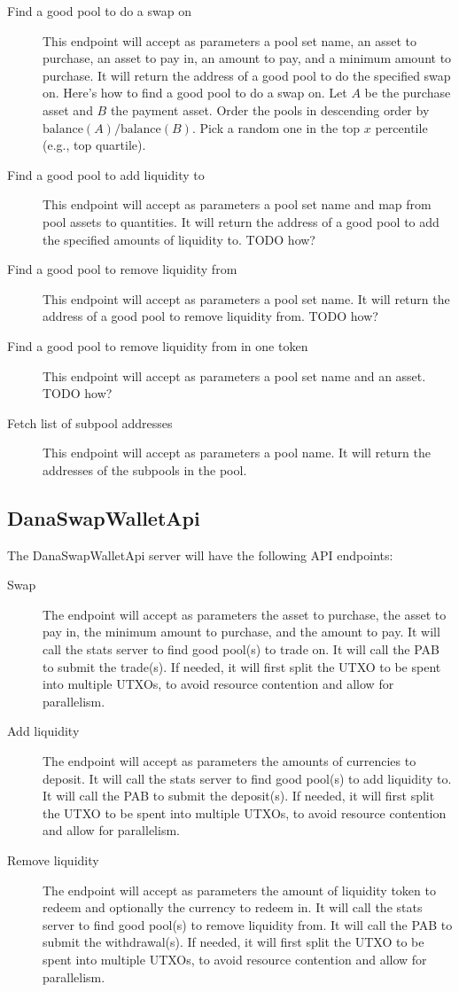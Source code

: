 \documentclass[12pt]{article}
\begin{document}
\begin{description}
	\item[Find a good pool to do a swap on] This endpoint will accept as parameters a pool set name, an asset to purchase, an asset to pay in, an amount to pay, and a minimum amount to purchase. It will return the address of a good pool to do the specified swap on. Here's how to find a good pool to do a swap on. Let $A$ be the purchase asset and $B$ the payment asset. Order the pools in descending order by $\text{balance}(A) / \text{balance}(B)$. Pick a random one in the top $x$ percentile (e.g., top quartile). 
	\item[Find a good pool to add liquidity to] This endpoint will accept as parameters a pool set name and map from pool assets to quantities. It will return the address of a good pool to add the specified amounts of liquidity to. TODO how?
	\item[Find a good pool to remove liquidity from] This endpoint will accept as parameters a pool set name. It will return the address of a good pool to remove liquidity from. TODO how?
	\item[Find a good pool to remove liquidity from in one token] This endpoint will accept as parameters a pool set name and an asset. TODO how?
	\item[Fetch list of subpool addresses] This endpoint will accept as parameters a pool name. It will return the addresses of the subpools in the pool.
\end{description}


\subsection{DanaSwapWalletApi}

The DanaSwapWalletApi server will have the following API endpoints:

\begin{description}
	\item[Swap] The endpoint will accept as parameters the asset to purchase, the asset to pay in, the minimum amount to purchase, and the amount to pay. It will call the stats server to find good pool(s) to trade on. It will call the PAB to submit the trade(s). If needed, it will first split the UTXO to be spent into multiple UTXOs, to avoid resource contention and allow for parallelism.
	\item[Add liquidity] The endpoint will accept as parameters the amounts of currencies to deposit. It will call the stats server to find good pool(s) to add liquidity to. It will call the PAB to submit the deposit(s). If needed, it will first split the UTXO to be spent into multiple UTXOs, to avoid resource contention and allow for parallelism.
	\item[Remove liquidity] The endpoint will accept as parameters the amount of liquidity token to redeem and optionally the currency to redeem in. It will call the stats server to find good pool(s) to remove liquidity from. It will call the PAB to submit the withdrawal(s). If needed, it will first split the UTXO to be spent into multiple UTXOs, to avoid resource contention and allow for parallelism.
\end{description}
\end{document}
